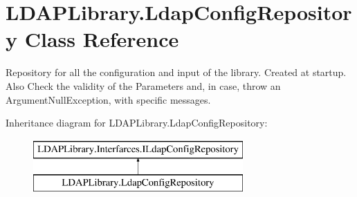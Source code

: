 \hypertarget{class_l_d_a_p_library_1_1_ldap_config_repository}{}\section{L\+D\+A\+P\+Library.\+Ldap\+Config\+Repository Class Reference}
\label{class_l_d_a_p_library_1_1_ldap_config_repository}


Repository for all the configuration and input of the library. Created at startup. Also Check the validity of the Parameters and, in case, throw an Argument\+Null\+Exception, with specific messages.  


Inheritance diagram for L\+D\+A\+P\+Library.\+Ldap\+Config\+Repository\+:\begin{figure}[H]
\begin{center}
\leavevmode
\includegraphics[height=2.000000cm]{class_l_d_a_p_library_1_1_ldap_config_repository}
\end{center}
\end{figure}
